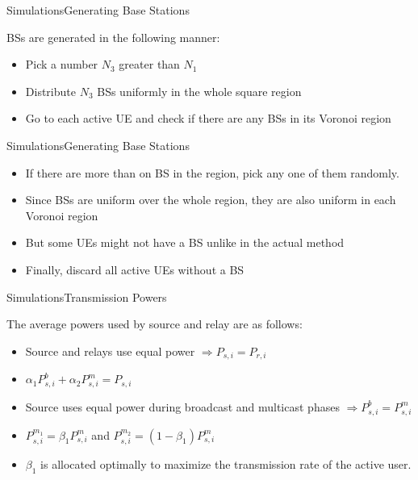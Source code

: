 \documentclass{beamer}
\begin{document}
\begin{frame}{Simulations}{Generating Base Stations}

BSs are generated in the following manner:
\vspace{1cm}
\begin{itemize}
\item Pick a number $N_3$ greater than $N_1$
\vspace{1cm}
\item Distribute $N_3$ BSs uniformly in the whole square region
\vspace{1cm}
\pause
\item Go to each active UE and check if there are any BSs in its Voronoi region
\end{itemize} 

\end{frame}

\begin{frame}{Simulations}{Generating Base Stations}
\vspace{-1cm}
\begin{itemize}
\item If there are more than on BS in the region, pick any one of them randomly. 
\vspace{0.75cm}
\item Since BSs are uniform over the whole region, they are also uniform in each Voronoi region
\vspace{0.75cm}
\item But some UEs might not have a BS unlike in the actual method
\vspace{0.75cm}
\item Finally, discard all active UEs without a BS
\end{itemize}

\end{frame}

\begin{frame}{Simulations}{Transmission Powers}

The average powers used by source and relay are as follows:
\vspace{0.5cm}
\begin{itemize}
\item Source and relays use equal power $\Rightarrow P_{s,i} = P_{r,i}$
\vspace{0.5cm}
\item $\alpha_1 P_{s,i}^b + \alpha_2 P_{s,i}^m = P_{s,i}$
\vspace{0.5cm}
\item Source uses equal power during broadcast and multicast phases $\Rightarrow P_{s,i}^b = P_{s,i}^m $
\vspace{0.5cm}
\item $P_{s,i}^{m_1} = \beta_1 P_{s,i}^m$ and $P_{s,i}^{m_2} = (1-\beta_1) P_{s,i}^m$
\vspace{0.5cm}
\item  $\beta_1$ is allocated optimally to maximize the transmission rate of the active user. 
\end{itemize} 

\end{frame}
\end{document}
